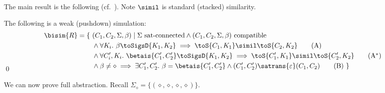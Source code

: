 The main result is the following (cf.\ ). Note $\simil$ is standard (stacked) similarity.

\begin{lemma}\label{lem:completeness}
The following is a weak (pushdown) simulation:
  \begin{align}
    \bisim{R} = \{\ &(C_1,C_2,\Sigma,\beta) \mid
\Sigma\text{ sat-connected}\land
                 (C_1,C_2,\Sigma,\beta)\text{ compatible}\notag\\
                    &{}\land\forall K_i.\ \beta\toSigsD{K_1,K_2}
                      \implies
                                                \toS{C_1,K_1}\simil\toS{C_2,K_2}\tag{A}\label{cond:a}\\
              & {}\land\forall C_i',K_i.\  \betais{C'_1,C'_2}\toSigsD{K_1,K_2}
                \implies
                \toS{C_1',K_1}\simil\toS{C_2',K_2}\tag{A$^*$}\label{cond:a1}\\
              & {}\land\beta\neq\diamond\implies\exists C_1',C_2'.\ \beta=\betais{C_1',C_2'}\land 
 (C_1',C_2')\satrans{\varepsilon}(C_1,C_2)\tag{B}\label{cond:b}
\    \}\\[-11mm]\notag
  \end{align}\qed
\end{lemma}


We can now prove full abstraction.   Recall $\Sigma_\diamond=\{(\diamond,\diamond,\diamond,\diamond)\}$. 


